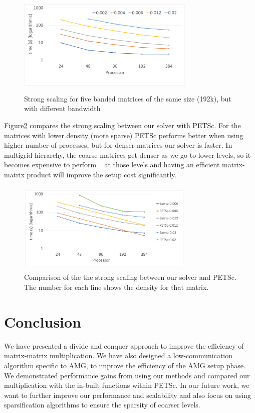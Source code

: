 \begin{figure}[tbh]
 \centering
 \includegraphics[width=8.5cm,height=4.9cm]{./figures/strong1.pdf}
 \caption{Strong scaling for five banded matrices of the same size (192k), but with different bandwidth}
 \label{fig:strong1}
\end{figure}

Figure\ref{fig:petsc1} compares the strong scaling between our solver with PETSc. For the matrices with lower density (more sparse) PETSc performs better when using higher number of processes, but for denser matrices our solver is faster. In multigrid hierarchy, the coarse matrices get denser as we go to lower levels, so it becomes expensive to perform \mm~ at those levels and having an efficient matrix-matrix product will improve the setup cost significantly.

\begin{figure}[tbh]
 \centering
 \includegraphics[width=8.5cm,height=4.4cm]{./figures/petsc1.pdf}
 \caption{Comparison of the the strong scaling between our solver and PETSc. The number for each line shows the density for that matrix.}
 \label{fig:petsc1}
\end{figure}

\section{Conclusion}
\label{sec:conc}

We have presented a divide and conquer approach to improve the efficiency of matrix-matrix multiplication. We have also designed a low-communication algorithm specific to AMG, to improve the efficiency of the AMG setup phase. We demonstrated performance gains from using our methods and compared our multiplication with the in-built functions within PETSc. In our future work, we want to further improve our performance and scalability and also focus on using sparsification algorithms to ensure the sparsity of coarser levels. 
